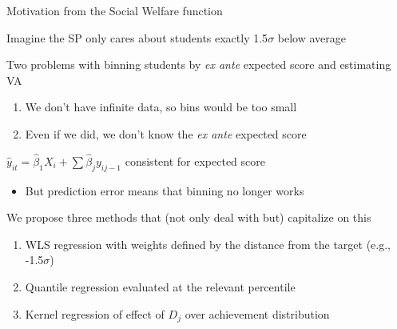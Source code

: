 \documentclass[t,aspectratio=169,11pt]{beamer}
\newenvironment{wideitemize}{\itemize\addtolength{\itemsep}{14pt}}{\enditemize}
\begin{document}
\begin{frame}{Motivation from the Social Welfare function}

\begin{wideitemize}
    \item Imagine the SP only cares about students exactly 1.5$\sigma$ below average
    
    \item<2-> Two problems with binning students by \textit{ex ante} expected score and estimating VA
    \begin{enumerate}
        \item<3-> We don't have infinite data, so bins would be too small
        \item<4-> Even if we did, we don't know the \textit{ex ante} expected score
    \end{enumerate}

    \item<5-> $\hat{y}_{it} = \hat{\beta}_1X_i + \sum \hat{\beta}_jy_{ij-1}$ consistent for expected score
    \begin{itemize}
        \item But prediction error means that binning no longer works %
    \end{itemize}

    \item<6-> We propose three methods that (not only deal with but) capitalize on this
    \begin{enumerate}
        \item WLS regression with weights defined by the distance from the target (e.g., -1.5$\sigma$)
        \item Quantile regression evaluated at the relevant percentile
        \item Kernel regression of effect of $D_j$ over achievement distribution
    \end{enumerate}

\end{wideitemize}

\end{frame}


\end{document}
